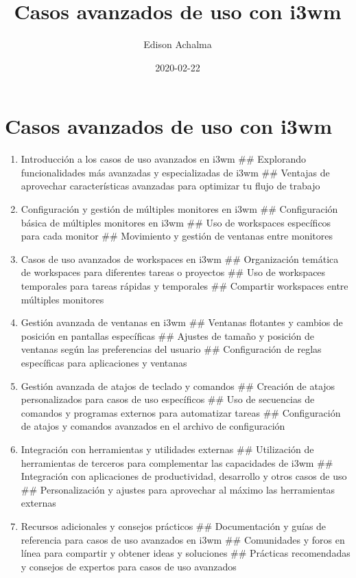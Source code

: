 \documentclass[
  jou,
  floatsintext,
  longtable,
  a4paper,
  nolmodern,
  notxfonts,
  notimes,
  12pt,
  colorlinks=true,linkcolor=blue,citecolor=blue,urlcolor=blue]{apa7}
\title{Casos avanzados de uso con i3wm}
\author{Edison Achalma}
\affiliation{
{Escuela Profesional de Economía, Universidad Nacional de San Cristóbal
de Huamanga}}
\date{2020-02-22}
\begin{document}
\maketitle


\hypertarget{toc}{}
\tableofcontents
\newpage
\section[Introduction]{Casos avanzados de uso con i3wm}

\setcounter{secnumdepth}{3}

\setlength\LTleft{0pt}




\begin{enumerate}
\def\labelenumi{\arabic{enumi}.}
\item
  Introducción a los casos de uso avanzados en i3wm \#\# Explorando
  funcionalidades más avanzadas y especializadas de i3wm \#\# Ventajas
  de aprovechar características avanzadas para optimizar tu flujo de
  trabajo
\item
  Configuración y gestión de múltiples monitores en i3wm \#\#
  Configuración básica de múltiples monitores en i3wm \#\# Uso de
  workspaces específicos para cada monitor \#\# Movimiento y gestión de
  ventanas entre monitores
\item
  Casos de uso avanzados de workspaces en i3wm \#\# Organización
  temática de workspaces para diferentes tareas o proyectos \#\# Uso de
  workspaces temporales para tareas rápidas y temporales \#\# Compartir
  workspaces entre múltiples monitores
\item
  Gestión avanzada de ventanas en i3wm \#\# Ventanas flotantes y cambios
  de posición en pantallas específicas \#\# Ajustes de tamaño y posición
  de ventanas según las preferencias del usuario \#\# Configuración de
  reglas específicas para aplicaciones y ventanas
\item
  Gestión avanzada de atajos de teclado y comandos \#\# Creación de
  atajos personalizados para casos de uso específicos \#\# Uso de
  secuencias de comandos y programas externos para automatizar tareas
  \#\# Configuración de atajos y comandos avanzados en el archivo de
  configuración
\item
  Integración con herramientas y utilidades externas \#\# Utilización de
  herramientas de terceros para complementar las capacidades de i3wm
  \#\# Integración con aplicaciones de productividad, desarrollo y otros
  casos de uso \#\# Personalización y ajustes para aprovechar al máximo
  las herramientas externas
\item
  Recursos adicionales y consejos prácticos \#\# Documentación y guías
  de referencia para casos de uso avanzados en i3wm \#\# Comunidades y
  foros en línea para compartir y obtener ideas y soluciones \#\#
  Prácticas recomendadas y consejos de expertos para casos de uso
  avanzados
\end{enumerate}
\end{document}
